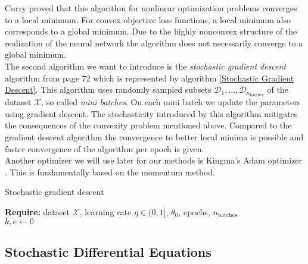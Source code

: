 \documentclass[11pt,titlepage]{article}
\theoremstyle{definition}
\theoremstyle{remark}
\begin{document}
	
	Curry \cite{Curry1944} proved that this algorithm for nonlinear optimization problems converges to a local minimum. For convex objective loss functions, a local minimum also corresponds to a global minimum. Due to the highly nonconvex structure of the realization of the neural network the algorithm does not necessarily converge to a global minimum. \\
	The second algorithm we want to introduce is the \textsl{stochastic gradient descent} algorithm from page 72 \cite{Kingma2019VAE} which is represented by algorithm \ref{Stochastic Gradient Descent}. This algorithm uses 
	randomly sampled subsets $\mathcal{D}_1,\ldots,\mathcal{D}_{n_{\mathrm{batches}}}$ of the 
	dataset $\mathcal{X}$, so called \textsl{mini batches}. On each mini batch we update 
	the parameters using gradient descent.
	The stochasticity introduced by this algorithm mitigates the consequences of the convexity problem mentioned above. Compared to the gradient descent algorithm the convergence to better local minima is possible and faster convergence of the algorithm per epoch is given. \\
	Another optimizer we will use later for our methods is Kingma's Adam optimizer \cite{Kingma2014Adam}. This is fundamentally based on the momentum method.\\
	\begin{algorithm}[H]
		\caption{Stochastic gradient descent} \label{Stochastic Gradient Descent}
		\textbf{Require:} dataset $\mathcal{X}$, learning rate $\eta\in (0,1]$, $\theta_0$, epochs, $n_{\mathrm{batches}}$\\
		$k,e\gets 0$\\
	\end{algorithm}
	
	
	
	\clearpage
	
	\subsection{Stochastic Differential Equations}
	
\end{document}
